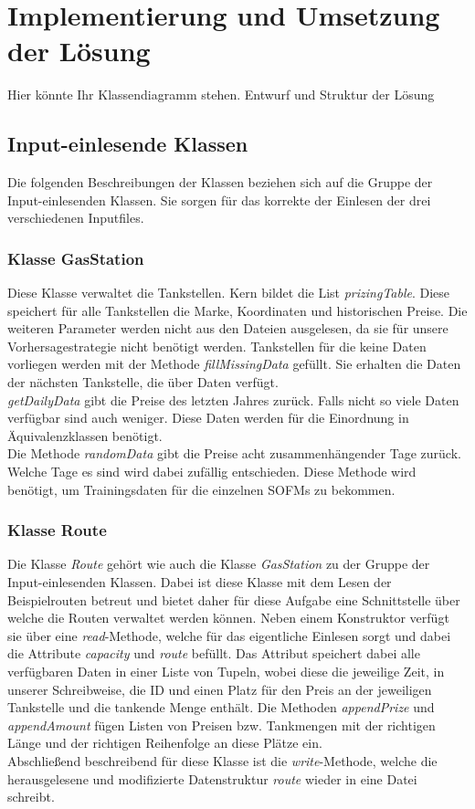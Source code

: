 \documentclass[11pt]{article}
\begin{document}
\section{Implementierung und Umsetzung der Lösung}
	Hier könnte Ihr Klassendiagramm stehen.	
	Entwurf und Struktur der Lösung
\subsection{Input-einlesende Klassen}
	Die folgenden Beschreibungen der Klassen beziehen sich auf die Gruppe der Input-einlesenden Klassen. Sie sorgen für das korrekte der Einlesen der drei verschiedenen Inputfiles.
\subsubsection{Klasse GasStation}
	Diese Klasse verwaltet die Tankstellen. Kern bildet die List \textit{prizingTable}. Diese speichert für alle Tankstellen die Marke, Koordinaten und historischen Preise. Die weiteren Parameter werden nicht aus den Dateien ausgelesen, da sie für unsere Vorhersagestrategie nicht benötigt werden. Tankstellen für die keine Daten vorliegen werden mit der Methode \textit{fillMissingData} gefüllt. Sie erhalten die Daten der nächsten Tankstelle, die über Daten verfügt.\\
	\textit{getDailyData} gibt die Preise des letzten Jahres zurück. Falls nicht so viele Daten verfügbar sind auch weniger. Diese Daten werden für die Einordnung in Äquivalenzklassen benötigt.\\
	Die Methode \textit{randomData} gibt die Preise acht zusammenhängender Tage zurück. Welche Tage es sind wird dabei zufällig entschieden. Diese Methode wird benötigt, um Trainingsdaten für die einzelnen SOFMs zu bekommen.
\subsubsection{Klasse Route}
	Die Klasse \textit{Route} gehört wie auch die Klasse \textit{GasStation} zu der Gruppe der Input-einlesenden Klassen. Dabei ist diese Klasse mit dem Lesen der Beispielrouten betreut und bietet daher für diese Aufgabe eine Schnittstelle über welche die Routen verwaltet werden können. Neben einem Konstruktor verfügt sie über eine \textit{read}-Methode, welche für das eigentliche Einlesen sorgt und dabei die Attribute \textit{capacity} und \textit{route} befüllt. Das Attribut speichert dabei alle verfügbaren Daten in einer Liste von Tupeln, wobei diese die jeweilige Zeit, in unserer Schreibweise, die ID und einen Platz für den Preis an der jeweiligen Tankstelle und die tankende Menge enthält. Die Methoden \textit{appendPrize} und \textit{appendAmount} fügen Listen von Preisen bzw. Tankmengen mit der richtigen Länge und der richtigen Reihenfolge an diese Plätze ein. \\
	Abschließend beschreibend für diese Klasse ist die \textit{write}-Methode, welche die herausgelesene und modifizierte Datenstruktur \textit{route} wieder in eine Datei schreibt.
\end{document}
